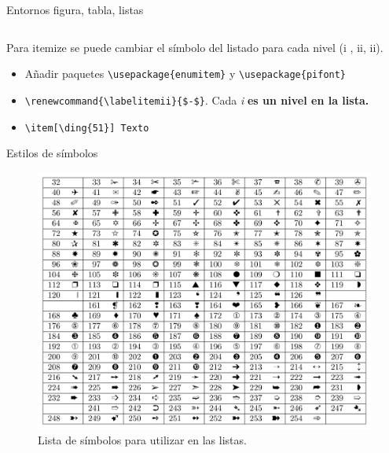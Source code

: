 \documentclass[aspectratio=169, 10pt]{beamer}
\begin{document}
\begin{frame}[fragile]{Entornos figura, tabla, listas}
\begin{columns}
\begin{column}{.48\linewidth}
    \end{column}
  
\end{columns}

\begin{alertblock}{Para itemize se puede cambiar el símbolo del listado para cada nivel (i , ii, ii).}
\begin{itemize}
    \item Añadir paquetes \verb|\usepackage{enumitem}| y \verb|\usepackage{pifont}|
    \item \verb|\renewcommand{\labelitemii}{$-$}|. Cada \textit{i} \textbf{es un nivel en la lista.}
    \item \verb|\item[\ding{51}] Texto| %
    
    
    
\end{itemize}
    
\end{alertblock}
\end{frame}


\begin{frame}{Estilos de símbolos}
    \begin{figure}[H]
        \centering
        \includegraphics[scale=1]{pifont.png} 
        \caption{Lista de símbolos para utilizar en las listas.}
        \label{fig:enter-label}
    \end{figure}
\end{frame}
\end{document}

